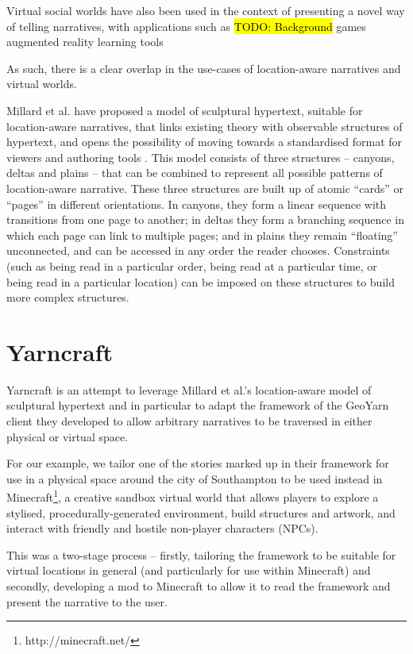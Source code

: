 \documentclass{acm}
\newcommand{\TODO}[1]{\hl{TODO: #1}}
\begin{document}
Virtual social worlds have also been used in the context of presenting a novel way of telling narratives, with applications such as
\TODO{Background}
games
augmented reality
learning tools \cite{avouris2012review}

As such, there is a clear overlap in the use-cases of location-aware narratives and virtual worlds.

Millard et al. have proposed a model of sculptural hypertext, suitable for location-aware narratives, that links existing theory with observable structures of hypertext, and opens the possibility of moving towards a standardised format for viewers and authoring tools \cite{millard13canyons}. This model consists of three structures -- canyons, deltas and plains -- that can be combined to represent all possible patterns of location-aware narrative. These three structures are built up of atomic ``cards'' or ``pages'' in different orientations. In canyons, they form a linear sequence with transitions from one page to another; in deltas they form a branching sequence in which each page can link to multiple pages; and in plains they remain ``floating'' unconnected, and can be accessed in any order the reader chooses. Constraints (such as being read in a particular order, being read at a particular time, or being read in a particular location) can be imposed on these structures to build more complex structures.


\section{Yarncraft}

Yarncraft is an attempt to leverage Millard et al.'s location-aware model of sculptural hypertext and in particular to adapt the framework of the GeoYarn client they developed to allow arbitrary narratives to be traversed in either physical or virtual space.

For our example, we tailor one of the stories marked up in their framework for use in a physical space around the city of Southampton to be used instead in Minecraft\footnote{http://minecraft.net/}, a creative sandbox virtual world that allows players to explore a stylised, procedurally-generated environment, build structures and artwork, and interact with friendly and hostile non-player characters (NPCs).

This was a two-stage process -- firstly, tailoring the framework to be suitable for virtual locations in general (and particularly for use within Minecraft) and secondly, developing a mod to Minecraft to allow it to read the framework and present the narrative to the user.
\end{document}

